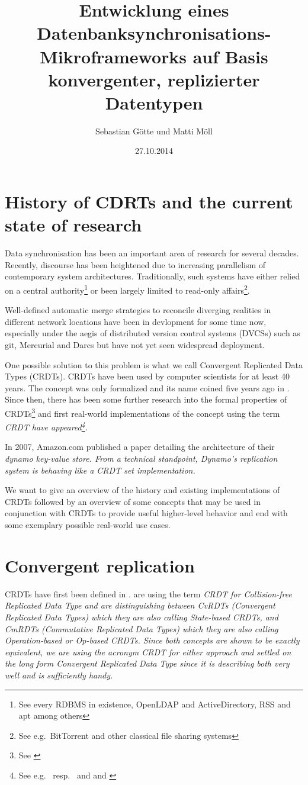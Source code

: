 \documentclass[12pt,a4paper,notitlepage]{article}
\author{Sebastian Götte und Matti Möll}
\title{Entwicklung eines Datenbanksynchronisations-Mikroframeworks auf Basis konvergenter, replizierter Datentypen}
\date{27.10.2014}
\begin{document}
\maketitle

\section{History of CDRTs and the current state of research}
Data synchronisation has been an important area of research for several decades. Recently, discourse has been heightened
due to increasing parallelism of contemporary system architectures. Traditionally, such systems have either relied on a
central authority\footnote{See every RDBMS in existence, OpenLDAP and ActiveDirectory, RSS and apt among others} or been
largely limited to read-only affairs\footnote{See e.g.\ BitTorrent and other classical file sharing systems}.

Well-defined automatic merge strategies to reconcile diverging realities in different network locations have been in
devlopment for some time now, especially under the aegis of distributed version control systems (DVCSs) such as git,
Mercurial and Darcs but have not yet seen widespread deployment.

One possible solution to this problem is what we call Convergent Replicated Data Types (CRDTs). CRDTs have been used by
computer scientists for at least 40 years. The concept was only formalized and its name coined five years ago in
\cite{inria09}. Since then, there has been some further research into the formal properties of CRDTs\footnote{See
\cite{inria11}} and first real-world implementations of the concept using the term \em{CRDT} have appeared\footnote{See
e.g.\ \cite{riak} resp.\ \cite{riak20-announcement} and \cite{riak-crdt} and \cite{roshi}}.

In 2007, Amazon.com published a paper detailing the architecture of their \em{dynamo} key-value store. From a technical
standpoint, Dynamo's replication system is behaving like a CRDT set implementation.

We want to give an overview of the history and existing implementations of CRDTs followed by an overview of some
concepts that may be used in conjunction with CRDTs to provide useful higher-level behavior and end with some exemplary
possible real-world use cases.

\section{Convergent replication}
CRDTs have first been defined in \cite{inria09}. \cite{inria09} are using the term \em{CRDT} for \em{Collision-free
Replicated Data Type} and are distinguishing between \em{CvRDTs} (\em{Convergent Replicated Data Types}) which they are
also calling \em{State-based CRDTs}, and \em{CmRDTs} (\em{Commutative Replicated Data Types}) which they are also
calling \em{Operation-based} or \em{Op-based CRDTs}. Since both concepts are shown to be exactly equivalent, we are
using the acronym \em{CRDT} for either approach and settled on the long form \em{Convergent Replicated Data Type} since
it is describing both very well and is sufficiently handy.
\end{document}
